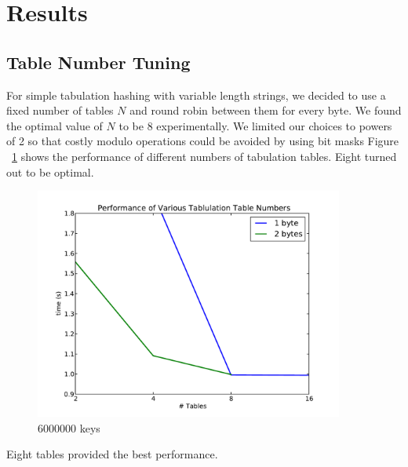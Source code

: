 \documentclass[11pt]{article}
\begin{document}
\section{Results}

\subsection{Table Number Tuning}

For simple tabulation hashing with variable length strings, we decided to use a
fixed number of tables $N$ and round robin between them for every byte.  We
found the optimal value of $N$ to be 8 experimentally.  We limited our choices
to powers of 2 so that costly modulo operations could be avoided by using bit
masks Figure ~\ref{fig:tables} shows the performance of different numbers of
tabulation tables.  Eight turned out to be optimal.
 \begin{figure}[H]
   \centering
   \includegraphics[width=4in]{tables.pdf}
   \caption{6000000 keys}
   \label{fig:tables}
 \end{figure}
       
Eight tables provided the best performance.
\end{document}
